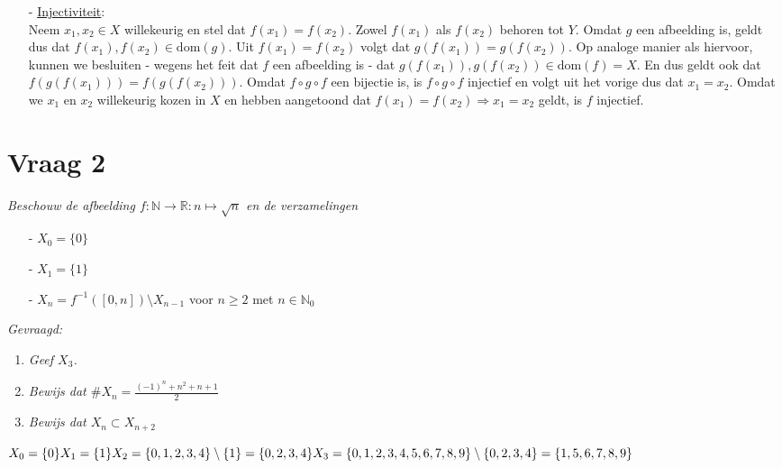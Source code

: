 \documentclass[kulak]{kulakarticle} %
\begin{document}
\begin{enumerate}
\begin{itemize}
			\item[-] \underline{Injectiviteit}:\\
			Neem \(x_1,x_2 \in X\) willekeurig en stel dat \(f(x_1)=f(x_2)\). Zowel \(f(x_1)\) als \(f(x_2)\) behoren tot \(Y\). Omdat \(g\) een afbeelding is, geldt dus dat \(f(x_1),f(x_2)\in \text{dom}(g)\). Uit \(f(x_1)=f(x_2)\) volgt dat \(g(f(x_1))=g(f(x_2))\). Op analoge manier als hiervoor, kunnen we besluiten - wegens het feit dat \(f\) een afbeelding is - dat \(g(f(x_1)),g(f(x_2))\in \text{dom}(f)=X\). En dus geldt ook dat \(f(g(f(x_1)))=f(g(f(x_2)))\). Omdat \(f\circ g \circ f\) een bijectie is, is \(f\circ g \circ f\) injectief en volgt uit  het vorige dus dat \(x_1=x_2\). Omdat we \(x_1\) en \(x_2\) willekeurig kozen in \(X\) en hebben aangetoond dat \(f(x_1)=f(x_2)\Rightarrow x_1=x_2\) geldt, is \(f\) injectief.
		\end{itemize}
	\end{enumerate}

	\section*{Vraag 2}

	\textit{	Beschouw de afbeelding \(f:\mathbb{N}\rightarrow\mathbb{R}:n\mapsto\sqrt{n}\) en de verzamelingen}
	\begin{itemize}
		\item[-] \(X_0=\{0\}\)
		\item[-] \(X_1=\{1\}\)
		\item[-] \(X_n=f^{-1}([0,n])\setminus X_{n-1}\) \hspace{1cm} voor \(n\geq2\) met \(n\in \mathbb{N}_0\)
	\end{itemize}

	\noindent \textit{Gevraagd:}

	\begin{enumerate}
		\item \textit{Geef \(X_3\).}
		\item \textit{Bewijs dat \(\#X_n=\frac{(-1)^n+n^2+n+1}{2}\)}
		\item \textit{Bewijs dat \(X_{n}\subset X_{n+2}\)}
	\end{enumerate}

	\newpage

	\( X_0=\{ 0 \} \\ X_1=\{ 1 \} \\ X_2=\{ 0,1,2,3,4 \} \setminus \{ 1 \} = \{ 0,2,3,4 \} \\ X_3=\{ 0,1,2,3,4,5,6,7,8,9 \} \setminus \{ 0,2,3,4 \} = \{ 1,5,6,7,8,9 \} \) \\
\end{document}
